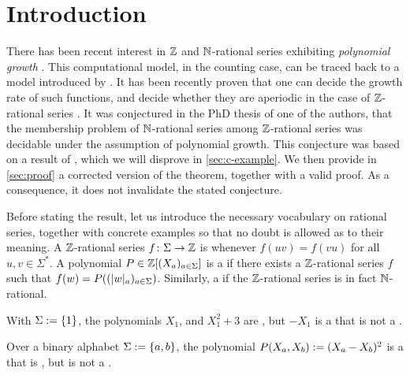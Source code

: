 \documentclass[a4paper,11pt]{article}
\begin{document}
\maketitle
\makeabstract
\acknowledge


\section{Introduction}

There has been recent interest in $\mathbb{Z}$ and $\mathbb{N}$-rational series exhibiting
\emph{polynomial growth} \cite{doueneau2021pebble,bojanczyk2022transducers}.
This computational model, in the counting case, can be traced back to a model
introduced by \textcite{schutzenberger1965finite}. It has been recently proven
that one can decide the growth rate of such functions, and decide whether they
are aperiodic in the case of $\mathbb{Z}$-rational series \cite{LOPEZ23b}. It was
conjectured in the PhD thesis of one of the authors, that the membership
problem of $\mathbb{N}$-rational series among $\mathbb{Z}$-rational series was decidable
under the assumption of polynomial growth. This conjecture was based on a
result of \textcite{KARH77}, which we will disprove in \cref{sec:c-example}. We
then provide in \cref{sec:proof} a corrected version of the theorem, together
with a valid proof. As a consequence, it does not invalidate the stated
conjecture.


\AP Before stating the result, let us introduce the necessary vocabulary on
rational series, together with concrete examples so that no doubt is allowed as
to their meaning. A $\mathbb{Z}$-rational series $f \colon \Sigma \to \mathbb{Z}$ is
 whenever $f(uv) = f(vu)$ for all $u,v \in \Sigma^*$. A
polynomial $P \in \mathbb{Z}[(X_a)_{a \in \Sigma}]$ is a  if there exists a  $\mathbb{Z}$-rational series $f$
such that $f(w) = P(\seqof{ \card[a]{w} }{a \in \Sigma})$. Similarly, a
 if the  $\mathbb{Z}$-rational
series is in fact $\mathbb{N}$-rational.

\begin{example}
    With $\Sigma \mathrel{:=} \mathopen{\{} 1 \mathclose{\}}$,
    the polynomials $X_1$, and $X_1^2 + 3$ are ,
    but $- X_1$ is a  that is 
    not a .
\end{example}

\begin{example}
    Over a binary alphabet $\Sigma \mathrel{:=} \mathopen{\{} a,b \mathclose{\}}$,
    the polynomial $P(X_a, X_b) \mathrel{:=} (X_a - X_b)^2$
    is a  that is ,
    but is
    not a .
\end{example}
\end{document}
